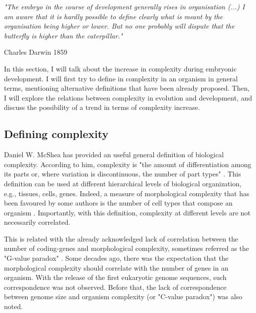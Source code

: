 \setlength{\epigraphrule}{0\p@}
\setlength{\epigraphwidth}{.7\textwidth}
\epigraph{\textit{"The embryo in the course of development generally rises in organisation (...) I am aware that it is hardly possible to define clearly what is meant by the organisation being higher or lower. But no one probably will dispute that the butterfly is higher than the caterpillar."}}{Charles Darwin 1859}

In this section, I will talk about the increase in complexity during embryonic development.
I will first try to define in complexity in an organism in general terms, mentioning alternative definitions that have been already proposed.
Then, I will explore the relations between complexity in evolution and development, and discuss the possibility of a trend in terms of complexity increase.


\subsection{Defining complexity}
Daniel W. McShea has provided an useful general definition of biological complexity. According to him, complexity is "the amount of differentiation among its parts or, where variation is discontinuous, the number of part types" \citep{McShea1996,McShea2015}.
This definition can be used at different hierarchical levels of biological organization, e.g., tissues, cells, genes.
Indeed, a measure of morphological complexity that has been favoured by some authors 
is the number of cell types that compose an organism 
	\citep{Valentine1994,Bell1997,Bonner2004}.
Importantly, with this definition, complexity at different levels are not necessarily correlated.


This is related with the already acknowledged lack of correlation between the number of coding-genes and morphological complexity, 
sometimes referred as the "G-value paradox"
	\citep{Hahn2002}.
Some decades ago, there was the expectation that the morphological complexity should correlate with the number of genes in an organism. 
With the release of the first eukaryotic genome sequences, such correspondence was not observed.
Before that, the lack of correspondence between genome size and organism complexity (or "C-value paradox") was also noted.

